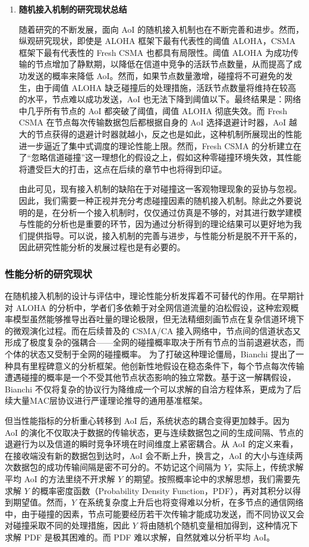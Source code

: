 \begin{enumerate}[wide]
    \item \textbf{随机接入机制的研究现状总结}
    
    随着研究的不断发展，面向 AoI 的随机接入机制也在不断完善和进步。然而，纵观研究现状，即使是 ALOHA 框架下最有代表性的阈值 ALOHA，CSMA 框架下最有代表性的 Fresh CSMA 也都具有局限性。阈值 ALOHA 为成功传输的节点增加了静默期，以降低在信道中竞争的活跃节点数量，从而提高了成功发送的概率来降低 AoI。然而，如果节点数量激增，碰撞将不可避免的发生，由于阈值 ALOHA 缺乏碰撞后的处理措施，活跃节点数量将维持在较高的水平，节点难以成功发送，AoI 也无法下降到阈值以下。最终结果是：网络中几乎所有节点的 AoI 都突破了阈值，阈值 ALOHA 彻底失效。而 Fresh CSMA 在节点每次传输数据包后都根据自身的 AoI 选择退避计时器，AoI 越大的节点获得的退避计时器就越小，反之也是如此，这种机制所展现出的性能进一步逼近了集中式调度的理论性能上限。然而，Fresh CSMA 的分析建立在了“忽略信道碰撞”这一理想化的假设之上，假如这种零碰撞环境失效，其性能将遭受巨大的打击，这点在后续的章节中也将得到印证。

    由此可见，现有接入机制的缺陷在于对碰撞这一客观物理现象的妥协与忽视。因此，我们需要一种正视并充分考虑碰撞因素的随机接入机制。除此之外要说明的是，在分析一个接入机制时，仅仅通过仿真是不够的，对其进行数学建模与性能的分析也是重要的环节，因为通过分析得到的理论结果可以更好地为我们提供指导。可以说，接入机制的完善与进步，与性能分析是脱不开干系的，因此研究性能分析的发展过程也是有必要的。
\end{enumerate}

\subsubsection{性能分析的研究现状}
在随机接入机制的设计与评估中，理论性能分析发挥着不可替代的作用。在早期针对 ALOHA 的分析中，学者们多依赖于对全网信道流量的泊松假设，这种宏观概率模型虽然能够推导出吞吐量的理论极限，但无法精细刻画节点在复杂信道环境下的微观演化过程。而在后续普及的 CSMA/CA 接入网络中，节点间的信道状态又形成了极度复杂的强耦合——全网的碰撞概率取决于所有节点的当前退避状态，而个体的状态又受制于全网的碰撞概率。
为了打破这种理论僵局，Bianchi 提出了一种具有里程碑意义的分析框架\cite{bianchi2002performance}。他创新性地假设在稳态条件下，每个节点每次传输遭遇碰撞的概率是一个不受其他节点状态影响的独立常数。基于这一解耦假设，Bianchi 不仅将复杂的协议行为降维成一个可以求解的自洽方程体系，更成为了后续大量MAC层协议进行严谨理论推导的通用基准框架。

但当性能指标的分析重心转移到 AoI 后，系统状态的耦合变得更加棘手。因为 AoI 的演化不仅取决于数据的传输状态，更与连续数据包之间的生成间隔、节点的退避行为以及信道的瞬时竞争环境在时间维度上紧密耦合。从 AoI 的定义来看，在接收端没有新的数据包到达时，AoI 会不断上升，换言之，AoI 的大小与连续两次数据包的成功传输间隔是密不可分的。不妨记这个间隔为 $Y$，实际上，传统求解平均 AoI 的方法里绕不开求解 $Y$ 的期望。按照概率论中的求解思想，我们需要先求解 $Y$ 的概率密度函数（Probability Density Function，PDF），再对其积分以得到期望值。然而，$Y$ 在系统复杂度上升后也将变得难以分析，在多节点的通信网络中，由于碰撞的因素，节点可能要经历若干次传输才能成功发送，而不同协议又会对碰撞采取不同的处理措施，因此 $Y$ 将由随机个随机变量相加得到，这种情况下求解 PDF 是极其困难的。而 PDF 难以求解，自然就难以分析平均 AoI。

